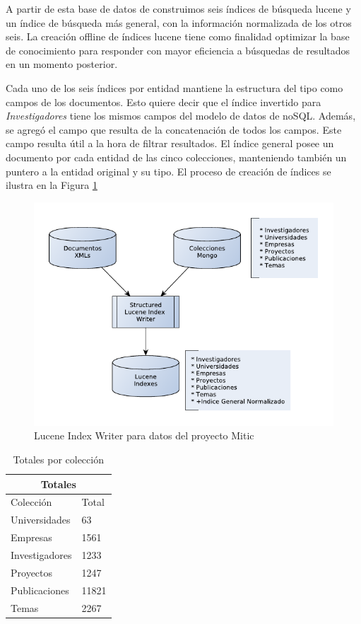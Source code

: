 A partir de esta base de datos de construimos seis índices de búsqueda lucene y un índice de búsqueda más general, con la información normalizada de los otros seis. La creación offline de índices lucene tiene como finalidad optimizar la base de conocimiento para responder con mayor eficiencia a búsquedas de resultados en un momento posterior. 

Cada uno de los seis índices por entidad mantiene la estructura del tipo como campos de los documentos. Esto quiere decir que el índice invertido para \emph{Investigadores} tiene los mismos campos
del modelo de datos de noSQL. Además, se agregó el campo  que resulta de la concatenación de todos los campos. Este campo resulta útil a la hora de filtrar resultados. El índice general posee un documento por cada entidad de las cinco colecciones, manteniendo también un puntero a la entidad original y su tipo. El proceso de creación de índices se ilustra en la Figura \ref{fig:LuceneIndexWriterEstructurado}%

 \begin{figure}[H]
   \centering
     \includegraphics{graficos/LuceneIndexWriterEstructurado}
   \caption{Lucene Index Writer para datos del proyecto Mitic}
   \label{fig:LuceneIndexWriterEstructurado}
 \end{figure}

\begin{center}
\begin{table}
\centering
\begin{tabular}{|  l | l |}
\hline
\multicolumn{2}{|c|}{Totales} \\ \hline
Colección & Total \\ \hline
Universidades & 63 \\ \hline 
Empresas & 1561\\ \hline 
Investigadores & 1233\\ \hline 
Proyectos & 1247\\ \hline 
Publicaciones & 11821\\ \hline
Temas & 2267\\ \hline  
\end{tabular}
\caption{Totales por colección}
\label{table:temas}
\end{table}
\end{center}

